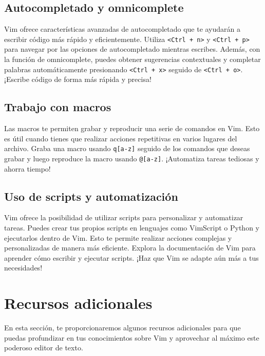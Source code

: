 \documentclass[
  a4paper,
]{article}
\begin{document}
\subsection{Autocompletado y
omnicomplete}\label{autocompletado-y-omnicomplete}

Vim ofrece características avanzadas de autocompletado que te ayudarán a
escribir código más rápido y eficientemente. Utiliza
\texttt{\textless{}Ctrl\ +\ n\textgreater{}} y
\texttt{\textless{}Ctrl\ +\ p\textgreater{}} para navegar por las
opciones de autocompletado mientras escribes. Además, con la función de
omnicomplete, puedes obtener sugerencias contextuales y completar
palabras automáticamente presionando
\texttt{\textless{}Ctrl\ +\ x\textgreater{}} seguido de
\texttt{\textless{}Ctrl\ +\ o\textgreater{}}. ¡Escribe código de forma
más rápida y precisa!

\subsection{Trabajo con macros}\label{trabajo-con-macros}

Las macros te permiten grabar y reproducir una serie de comandos en Vim.
Esto es útil cuando tienes que realizar acciones repetitivas en varios
lugares del archivo. Graba una macro usando \texttt{q{[}a-z{]}} seguido
de los comandos que deseas grabar y luego reproduce la macro usando
\texttt{@{[}a-z{]}}. ¡Automatiza tareas tediosas y ahorra tiempo!

\subsection{Uso de scripts y
automatización}\label{uso-de-scripts-y-automatizaciuxf3n}

Vim ofrece la posibilidad de utilizar scripts para personalizar y
automatizar tareas. Puedes crear tus propios scripts en lenguajes como
VimScript o Python y ejecutarlos dentro de Vim. Esto te permite realizar
acciones complejas y personalizadas de manera más eficiente. Explora la
documentación de Vim para aprender cómo escribir y ejecutar scripts.
¡Haz que Vim se adapte aún más a tus necesidades!

\section{Recursos adicionales}\label{recursos-adicionales}

En esta sección, te proporcionaremos algunos recursos adicionales para
que puedas profundizar en tus conocimientos sobre Vim y aprovechar al
máximo este poderoso editor de texto.
\end{document}
